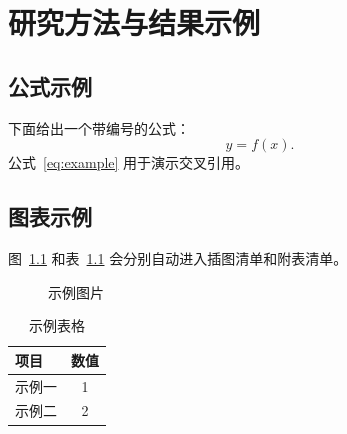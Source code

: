\chapter{研究方法与结果示例}
\section{公式示例}
下面给出一个带编号的公式：
\begin{equation}\label{eq:example}
  y = f(x).
\end{equation}
公式~\eqref{eq:example} 用于演示交叉引用。
\section{图表示例}
图~\ref{fig:example} 和表~\ref{tab:example} 会分别自动进入插图清单和附表清单。
\begin{figure}[htbp]
  \centering
  \caption{示例图片}\label{fig:example}
\end{figure}
\begin{table}[htbp]
  \centering
  \caption{示例表格}\label{tab:example}
  \begin{tabular}{lc}\toprule
    项目 & 数值 \\\midrule
    示例一 & 1 \\
    示例二 & 2 \\\bottomrule
  \end{tabular}
\end{table}
